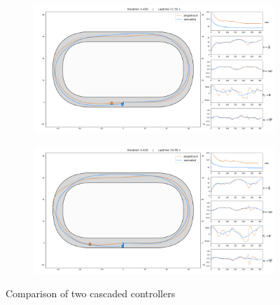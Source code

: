 \documentclass[a4paper, onecolumn, 12pt]{article}
\begin{document}
\begin{figure}[H]
    \centering
    \begin{subfigure}{0.9\textwidth}
        \centering
        \includegraphics[width=\textwidth]{assets/race1_ippodromo.png}
    \end{subfigure}
    \begin{subfigure}{0.9\textwidth}
        \centering
        \includegraphics[width=\textwidth]{assets/race3_ippodromo.png}
        \label{singletrack_outside}
    \end{subfigure}
    \caption[short]{Comparison of two cascaded controllers}
    \label{race_ippodromo}
\end{figure}
\end{document}
